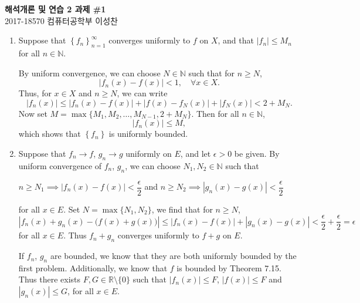 \documentclass[12pt]{report}
\newcommand{\numl}[1]{\item[\large\textbf{\sffamily #1.}]}
\newcommand{\bs}{\setminus}
\newcommand{\abs}[1]{\left| #1 \right|}
\newcommand{\seq}[1]{\left\{ #1 \right\}}
\newcommand{\ra}{\rightarrow}
\newcommand{\R}{\mathbb{R}}
\newcommand{\N}{\mathbb{N}}
\begin{document}
\begin{center}
    \textbf{\Large 해석개론 및 연습 2 과제 \#1}\\
    \large 2017-18570 컴퓨터공학부 이성찬
\end{center}
\begin{enumerate}
    \numl{1} Suppose that \(\seq{f_n}_{n=1}^\infty\) converges uniformly to \(f\) on \(X\), and that \(\abs{f_n} \leq M_n\) for all \(n \in \N\).

    By uniform convergence, we can choose \(N \in \N\) such that for \(n \geq N\),
    \[
        \abs{f_n(x) - f(x)} < 1, \quad \forall x \in X.
    \]
    Thus, for \(x \in X\) and \(n \geq N\), we can write
    \[
        \abs{f_n(x)} \leq \abs{f_n(x) - f(x)} + \abs{f(x) - f_N(x)} + \abs{f_N(x)} < 2 + M_N.
    \]
    Now set \(M = \max\{M_1, M_2, \dots, M_{N-1}, 2 + M_N\}\). Then for all \(n \in \N\),
    \[
        \abs{f_n(x)} \leq M,
    \]
    which shows that \(\seq{f_n}\) is uniformly bounded.

    \numl{2} Suppose that \(f_n \ra f\), \(g_n \ra g\) uniformly on \(E\), and let \(\epsilon > 0\) be given. By uniform convergence of \(f_n\), \(g_n\), we can choose \(N_1, N_2 \in \N\) such that
    \begin{center}
        \(n \geq N_1 \implies \abs{f_n(x) - f(x)} < \dfrac{\epsilon}{2}\) and \(n \geq N_2 \implies \abs{g_n(x) - g(x)} < \dfrac{\epsilon}{2}\)
    \end{center}
    for all \(x \in E\). Set \(N = \max\{N_1, N_2\}\), we find that for \(n \geq N\),
    \[
        \abs{f_n(x) + g_n(x) - \bigl(f(x) + g(x)\bigr)} \leq \abs{f_n(x) - f(x)} + \abs{g_n(x) - g(x)} < \frac{\epsilon}{2} + \frac{\epsilon}{2} = \epsilon
    \]
    for all \(x \in E\). Thus \(f_n + g_n\) converges uniformly to \(f + g\) on \(E\).

    If \(f_n\), \(g_n\) are bounded, we know that they are both uniformly bounded by the first problem. Additionally, we know that \(f\) is bounded by {\sffamily Theorem 7.15}. Thus there exists \(F, G \in \R \bs \{0\}\) such that \(\abs{f_n(x)} \leq F\), \(\abs{f(x)} \leq F\) and \(\abs{g_n(x)} \leq G\), for all \(x \in E\).


\end{enumerate}
\end{document}
